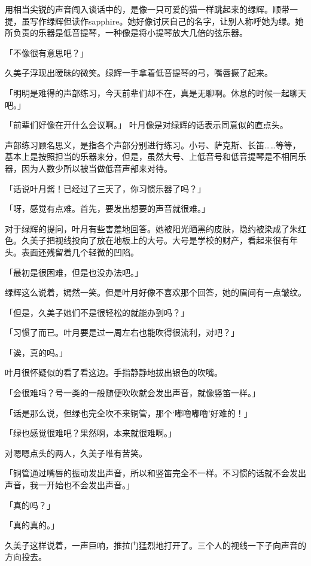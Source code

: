 \documentclass[UTF8]{ctexart}
\begin{document}
    用相当尖锐的声音闯入谈话中的，是像一只可爱的猫一样跳起来的绿辉。顺带一提，虽写作绿辉但读作sapphire。她好像讨厌自己的名字，让别人称呼她为绿。她所负责的乐器是低音提琴，一种像是将小提琴放大几倍的弦乐器。

    「不像很有意思吧？」

    久美子浮现出暧昧的微笑。绿辉一手拿着低音提琴的弓，嘴唇撅了起来。

    「明明是难得的声部练习，今天前辈们却不在，真是无聊啊。休息的时候一起聊天吧。」

    「前辈们好像在开什么会议啊。」 叶月像是对绿辉的话表示同意似的直点头。

    声部练习顾名思义，是指各个声部分别进行练习。小号、萨克斯、长笛……等等，基本上是按照担当的乐器来分，但是，虽然大号、上低音号和低音提琴是不相同乐器，因为人数少所以被当做低音声部来对待。

    「话说叶月酱！已经过了三天了，你习惯乐器了吗？」

    「呀，感觉有点难。首先，要发出想要的声音就很难。」

    对于绿辉的提问，叶月有些害羞地回答。她被阳光晒黑的皮肤，隐约被染成了朱红色。久美子把视线投向了放在地板上的大号。大号是学校的财产，看起来很有年头。表面还残留着几个轻微的凹陷。

    「最初是很困难，但是也没办法吧。」

    绿辉这么说着，嫣然一笑。但是叶月好像不喜欢那个回答，她的眉间有一点皱纹。

    「但是，久美子她们不是很轻松的就能办到吗？」

    「习惯了而已。叶月要是过一周左右也能吹得很流利，对吧？」

    「诶，真的吗。」

    叶月很怀疑似的看了看这边。手指静静地拔出银色的吹嘴。

    「会很难吗？号一类的一般随便吹吹就会发出声音，就像竖笛一样。」

    「话是那么说，但绿也完全吹不来铜管，那个‘嘟噜嘟噜’好难的！」

    「绿也感觉很难吧？果然啊，本来就很难啊。」

    对嗯嗯点头的两人，久美子唯有苦笑。

    「铜管通过嘴唇的振动发出声音，所以和竖笛完全不一样。不习惯的话就不会发出声音，我一开始也不会发出声音。」

    「真的吗？」

    「真的真的。」

    久美子这样说着，一声巨响，推拉门猛烈地打开了。三个人的视线一下子向声音的方向投去。
\end{document}
